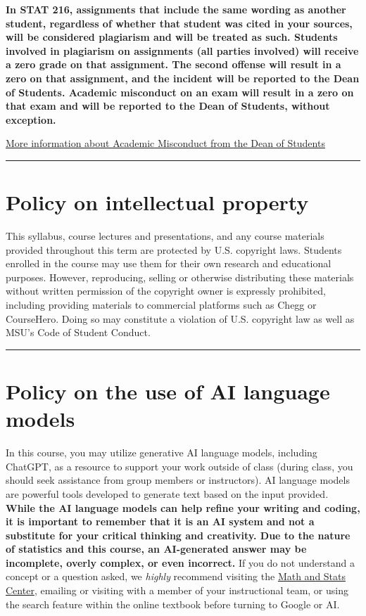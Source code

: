 \documentclass[
]{article}
\begin{document}
\textbf{ In STAT 216, assignments that include the same wording as
another student, regardless of whether that student was cited in your
sources, will be considered plagiarism and will be treated as such.
Students involved in plagiarism on assignments (all parties involved)
will receive a zero grade on that assignment. The second offense will
result in a zero on that assignment, and the incident will be reported
to the Dean of Students. Academic misconduct on an exam will result in a
zero on that exam and will be reported to the Dean of Students, without
exception.}

\href{https://www.montana.edu/deanofstudents/academicmisconduct/academicmisconduct.html}{More
information about Academic Misconduct from the Dean of Students}

\begin{center}\rule{0.5\linewidth}{0.5pt}\end{center}

\section{Policy on intellectual
property}\label{policy-on-intellectual-property}

This syllabus, course lectures and presentations, and any course
materials provided throughout this term are protected by U.S. copyright
laws. Students enrolled in the course may use them for their own
research and educational purposes. However, reproducing, selling or
otherwise distributing these materials without written permission of the
copyright owner is expressly prohibited, including providing materials
to commercial platforms such as Chegg or CourseHero. Doing so may
constitute a violation of U.S. copyright law as well as MSU's Code of
Student Conduct.

\begin{center}\rule{0.5\linewidth}{0.5pt}\end{center}

\section{Policy on the use of AI language models}\label{AI}

In this course, you may utilize generative AI language models, including
ChatGPT, as a resource to support your work outside of class (during
class, you should seek assistance from group members or instructors). AI
language models are powerful tools developed to generate text based on
the input provided. \textbf{While the AI language models can help refine
your writing and coding, it is important to remember that it is an AI
system and not a substitute for your critical thinking and creativity.
Due to the nature of statistics and this course, an AI-generated answer
may be incomplete, overly complex, or even incorrect.} If you do not
understand a concept or a question asked, we \emph{highly} recommend
visiting the \href{https://math.montana.edu/undergrad/msc/}{Math and
Stats Center}, emailing or visiting with a member of your instructional
team, or using the search feature within the online textbook before
turning to Google or AI.
\end{document}
